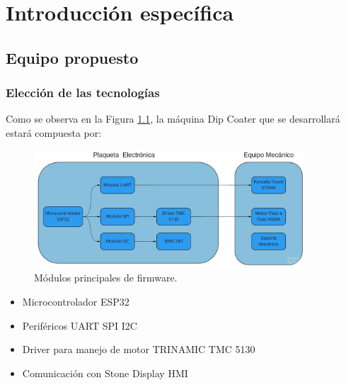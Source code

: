 
\chapter{Introducción específica} %

\label{Chapter2} %


\section{Equipo propuesto}

\subsection{Elección de las tecnologías}

Como se observa en la Figura \ref{fig:equipo}, la máquina Dip Coater que se desarrollará estará compuesta por: 

\begin{figure}[htpb]
\centering 
\includegraphics[width=0.9\textwidth]{./Figures/equipo.png}
\caption{Módulos principales de firmware.}
\label{fig:equipo}
\end{figure}
\vspace{25px}


\begin{itemize}
\item Microcontrolador ESP32 
\item Periféricos UART SPI I2C 
\item Driver para manejo de motor TRINAMIC  TMC 5130
\item Comunicación con Stone Display HMI 
\end{itemize}

